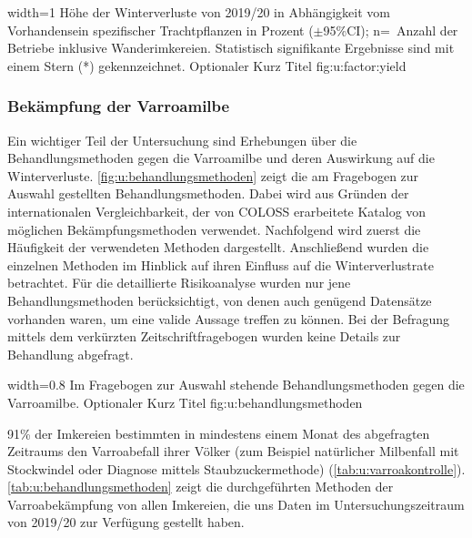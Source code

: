 {width=1\textwidth} %
{Höhe der Winterverluste von 2019/20 in Abhängigkeit vom Vorhandensein spezifischer Trachtpflanzen in Prozent ($\pm$95\%CI); n=~Anzahl der Betriebe inklusive Wanderimkereien. Statistisch signifikante Ergebnisse sind mit einem Stern (*) gekennzeichnet.} %
{Optionaler Kurz Titel} %
{fig:u:factor:yield} %

\newpage

\subsubsection{Bekämpfung der Varroamilbe}
\label{ss:baekempfung_varroa:U}

Ein wichtiger Teil der Untersuchung sind Erhebungen über die Behandlungsmethoden gegen die Varroamilbe und deren Auswirkung auf die Winterverluste. \cref{fig:u:behandlungsmethoden} zeigt die am Fragebogen zur Auswahl gestellten Behandlungsmethoden. Dabei wird aus Gründen der internationalen Vergleichbarkeit, der von COLOSS erarbeitete Katalog von möglichen Bekämpfungsmethoden verwendet. Nachfolgend wird zuerst die Häufigkeit der verwendeten Methoden dargestellt. Anschließend wurden die einzelnen Methoden im Hinblick auf ihren Einfluss auf die Winterverlustrate betrachtet. Für die detaillierte Risikoanalyse wurden nur jene Behandlungsmethoden berücksichtigt, von denen auch genügend Datensätze vorhanden waren, um eine valide Aussage treffen zu können. Bei der Befragung mittels dem verkürzten Zeitschriftfragebogen wurden keine Details zur Behandlung abgefragt.

{width=0.8\textwidth} %
{Im Fragebogen zur Auswahl stehende Behandlungsmethoden gegen die Varroamilbe.} %
{Optionaler Kurz Titel} %
{fig:u:behandlungsmethoden} %

91\% der Imkereien bestimmten in mindestens einem Monat des abgefragten Zeitraums den Varroabefall ihrer Völker (zum Beispiel natürlicher Milbenfall mit Stockwindel oder Diagnose mittels Staubzuckermethode) (\cref{tab:u:varroakontrolle}). 
\newline
\cref{tab:u:behandlungsmethoden} zeigt die durchgeführten Methoden der Varroabekämpfung von allen Imkereien, die uns Daten im Untersuchungszeitraum von 2019/20 zur Verfügung gestellt haben.

